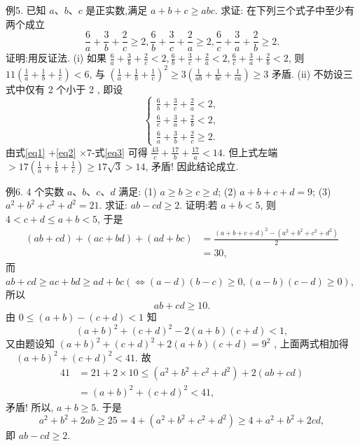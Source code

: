 例5. 已知 $a 、 b 、 c$ 是正实数,满足 $a+b+c \geqslant a b c$. 求证: 在下列三个式子中至少有两个成立
$$
\frac{6}{a}+\frac{3}{b}+\frac{2}{c} \geqslant 2, \frac{6}{b}+\frac{3}{c}+\frac{2}{a} \geqslant 2, \frac{6}{c}+\frac{3}{a}+\frac{2}{b} \geqslant 2 .
$$
证明:用反证法.
(i) 如果 $\frac{6}{a}+\frac{3}{b}+\frac{2}{c}<2, \frac{6}{b}+\frac{3}{c}+\frac{2}{a}<2, \frac{6}{c}+\frac{3}{a}+\frac{2}{b}<2$, 则 $11\left(\frac{1}{a}+\frac{1}{b}+\frac{1}{c}\right)<6$, 与 $\left(\frac{1}{a}+\frac{1}{b}+\frac{1}{c}\right)^2 \geqslant 3\left(\frac{1}{a b}+\frac{1}{b c}+\frac{1}{c a}\right) \geqslant 3$ 矛盾.
(ii) 不妨设三式中仅有 2 个小于 2 , 即设
$$
\left\{\begin{array}{l}
\frac{6}{b}+\frac{3}{c}+\frac{2}{a}<2, \label{eq1} \\
\frac{6}{c}+\frac{3}{a}+\frac{2}{b}<2, \label{eq2} \\
\frac{6}{a}+\frac{3}{b}+\frac{2}{c} \geqslant 2 . \label{eq3}
\end{array}\right.
$$
由式\ref{eq1} +\ref{eq2} $\times 7$-式\ref{eq3} 可得 $\frac{43}{c}+\frac{17}{b}+\frac{17}{a}<14$.
但上式左端 $>17\left(\frac{1}{a}+\frac{1}{b}+\frac{1}{c}\right) \geqslant 17 \sqrt{3}>14$, 矛盾!
因此结论成立.



例6.  4 个实数 $a 、 b 、 c 、 d$ 满足:
(1) $a \geqslant b \geqslant c \geqslant d$;
(2) $a+b+c+d=9$;
(3) $a^2+b^2+c^2+d^2=21$.
求证: $a b-c d \geqslant 2$.
证明:若 $a+b<5$, 则 $4<c+d \leqslant a+b<5$, 于是
$$
\begin{aligned}
(a b+c d)+(a c+b d)+(a d+b c) & =\frac{(a+b+c+d)^2-\left(a^2+b^2+c^2+d^2\right)}{2} \\
& =30,
\end{aligned}
$$
而 $a b+c d \geqslant a c+b d \geqslant a d+b c(\Leftrightarrow(a-d)(b-c) \geqslant 0,(a-b)(c-d) \geqslant 0)$, 所以
$$
a b+c d \geqslant 10 .
$$
由 $0 \leqslant(a+b)-(c+d)<1$ 知
$$
(a+b)^2+(c+d)^2-2(a+b)(c+d)<1,
$$
又由题设知 $(a+b)^2+(c+d)^2+2(a+b)(c+d)=9^2$ ,
上面两式相加得 $\quad(a+b)^2+(c+d)^2<41$.
故
$$
\begin{aligned}
41 & =21+2 \times 10 \leqslant\left(a^2+b^2+c^2+d^2\right)+2(a b+c d) \\
& =(a+b)^2+(c+d)^2<41,
\end{aligned}
$$
矛盾! 所以, $a+b \geqslant 5$.
于是
$$
a^2+b^2+2 a b \geqslant 25=4+\left(a^2+b^2+c^2+d^2\right) \geqslant 4+a^2+b^2+2 c d,
$$
即 $a b-c d \geqslant 2$.



